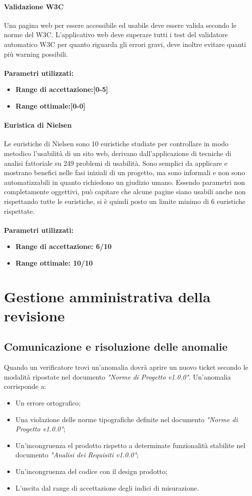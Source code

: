 \documentclass[12pt,a4paper,titlepage]{article}
\begin{document}
			\paragraph{Validazione W3C}
			Una pagina web per essere accessibile ed usabile deve essere valida secondo le norme del W3C. L'applicativo web deve superare tutti i test del validatore automatico W3C per quanto riguarda gli errori gravi, deve inoltre evitare quanti più warning possibili.
			\\ \\
			\textbf{Parametri utilizzati:}
			\begin{itemize}
				\item \textbf{Range di accettazione:[0-5]}
				\item \textbf{Range ottimale:[0-0]}
			\end{itemize}
			\paragraph{Euristica di Nielsen}
			Le euristiche di Nielsen sono 10 euristiche studiate per controllare in modo metodico l'usabilità di un sito web, derivano dall'applicazione di tecniche di analisi fattoriale su 249 problemi di usabilità. Sono semplici da applicare e mostrano benefici nelle fasi iniziali di un progetto, ma sono informali e non sono automatizzabili in quanto richiedono un giudizio umano. Essendo parametri non completamente oggettivi, può capitare che alcune pagine siano usabili anche non rispettando tutte le euristiche, si è quindi posto un limite minimo di 6 euristiche rispettate.
			\\ \\
			\textbf{Parametri utilizzati:}
			\begin{itemize}
				\item \textbf{Range di accettazione: 6/10}
				\item \textbf{Range ottimale: 10/10}
			\end{itemize}
	\section{Gestione amministrativa della revisione}
		\subsection{Comunicazione e risoluzione delle anomalie}
		Quando un verificatore trovi un'anomalia dovrà aprire un nuovo ticket secondo le modalità ripostate nel documento \textit{"Norme di Progetto v1.0.0"}. Un'anomalia corrisponde a:
		\begin{itemize}
			\item Un errore ortografico;
			\item Una violazione delle norme tipografiche definite nel documento \textit{"Norme di Progetto v1.0.0"}; 
			\item Un'incongruenza el prodotto rispetto a determinate funzionalità stabilite nel documento \textit{"Analisi dei Requisiti v1.0.0"};
			\item Un'incongruenza del codice con il design prodotto;
			\item L'uscita dal range di accettazione degli indici di misurazione.
		\end{itemize}
\end{document}
